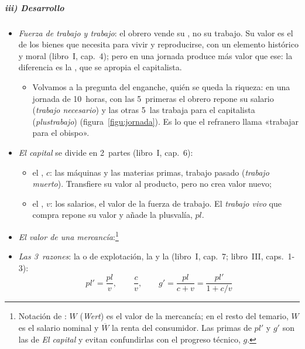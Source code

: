 \documentclass[11pt]{article}
\begin{document}
\subparagraph{iii) Desarrollo}
\begin{itemize}
\item \emph{Fuerza de trabajo y trabajo}: el obrero vende su , no su trabajo. Su valor es el de los bienes que necesita para vivir y reproducirse, con un elemento histórico y moral (libro~I, cap.~4); pero en una jornada produce más valor que ese: la diferencia es la , que se apropia el capitalista\nocite{Marx1867Kapital}.
  \begin{itemize}
  \item Volvamos a la pregunta del enganche, quién se queda la riqueza: en una jornada de 10~horas, con las 5~primeras el obrero repone su salario (\emph{trabajo necesario}) y las otras 5~las trabaja para el capitalista (\emph{plustrabajo}) (figura~\ref{figu:jornada}). Es lo que el refranero llama «trabajar para el obispo».
  \end{itemize}
\item \emph{El capital} se divide en 2~partes (libro~I, cap.~6):
  \begin{itemize}
  \item el , $c$: las máquinas y las materias primas, trabajo pasado (\emph{trabajo muerto}). Transfiere su valor al producto, pero no crea valor nuevo;
  \item el , $v$: los salarios, el valor de la fuerza de trabajo. El \emph{trabajo vivo} que compra repone su valor y añade la plusvalía, $\mathit{pl}$.
  \end{itemize}
\item \emph{El valor de una mercancía}:\footnote{Notación de : $W$ (\emph{Wert}) es el valor de la mercancía; en el resto del temario, $W$ es el salario nominal y $\overline W$ la renta del consumidor. Las primas de $\mathit{pl}'$ y $g'$ son las de \emph{El capital} y evitan confundirlas con el progreso técnico, $g$.}
\item \emph{Las 3~razones}: la  o de explotación, la  y la  (libro~I, cap.~7; libro~III, caps.~1-3):
  \begin{equation}\label{eq:tasas-marx}
  \mathit{pl}'=\frac{\mathit{pl}}{v},\qquad \frac{c}{v},\qquad g'=\frac{\mathit{pl}}{c+v}=\frac{\mathit{pl}'}{1+c/v}
  \end{equation}

\end{itemize}
\end{document}
